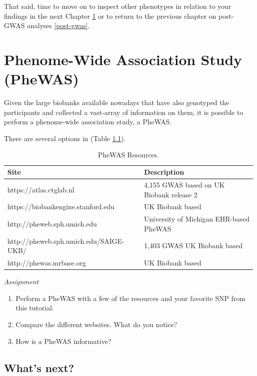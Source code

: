 \documentclass[
]{book}
\providecommand{\tightlist}{%
  \setlength{\itemsep}{0pt}\setlength{\parskip}{0pt}}
\begin{document}
That said, time to move on to inspect other phenotypes in relation to your findings in the next Chapter \ref{phewas} or to return to the previous chapter on post-GWAS analyses \ref{post-gwas}.

\hypertarget{phewas}{%
\chapter{Phenome-Wide Association Study (PheWAS)}\label{phewas}}

Given the large biobanks available nowadays that have also genotyped the participants and collected a vast-array of information on them, it is possible to perform a phenome-wide association study, a PheWAS.

There are several options in (Table \ref{tab:tab-phewas}).

\begin{table}

\caption{\label{tab:tab-phewas}PheWAS Resources.}
\centering
\begin{tabular}[t]{l|l}
\hline
Site & Description\\
\hline
https://atlas.ctglab.nl & 4,155 GWAS based on UK Biobank release 2\\
\hline
https://biobankengine.stanford.edu & UK Biobank based\\
\hline
http://pheweb.sph.umich.edu & University of Michigan EHR-based PheWAS\\
\hline
http://pheweb.sph.umich.edu/SAIGE-UKB/ & 1,403 GWAS UK Biobank based\\
\hline
http://phewas.mrbase.org & UK Biobank based\\
\hline
\end{tabular}
\end{table}

\emph{Assignment}

\begin{enumerate}
\def\labelenumi{\arabic{enumi}.}
\tightlist
\item
  Perform a PheWAS with a few of the resources and your favorite SNP from this tutorial.
\item
  Compare the different websites. What do you notice?
\item
  How is a PheWAS informative?
\end{enumerate}

\hypertarget{whats-next}{%
\section{What's next?}\label{whats-next}}
\end{document}
